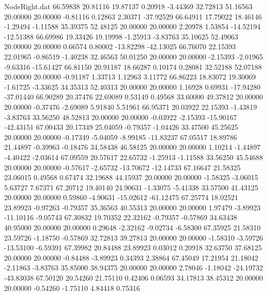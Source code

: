 \begin{filecontents}{NodeRight.dat}
  66.59838   20.81116   19.87137     0.20918   -3.44369   32.72813   51.16563   20.00000   20.00000   -0.81116    0.12863    2.30371  -37.92529
  66.64911   17.79022   18.46146    -1.29494   -1.11588   35.39375   52.48125   20.00000   20.00000    2.20978    1.53854  -14.52194  -12.51388
  66.69986   19.33426   19.19998    -1.25913   -3.83763   35.10625   52.49063   20.00000   20.00000    0.66574    0.80002  -13.82298  -42.13025
  66.76070   22.15393   22.01965    -0.86519   -1.40238   32.46563   50.01250   20.00000   20.00000   -2.15393   -2.01965   -9.63316  -15.61427
  66.81150   20.91187   18.66287     0.10174    0.28081   32.52188   52.07188   20.00000   20.00000   -0.91187    1.33713    1.12963    3.11772
  66.86223   18.83072   19.30069    -1.61725   -3.33625   34.35313   52.40313   20.00000   20.00000    1.16928    0.69931  -17.94280  -37.01440
  66.90289   20.37476   22.69089     0.53149    0.49568   33.60000   49.37812   20.00000   20.00000   -0.37476   -2.69089    5.91840    5.51961
  66.95371   20.03922   22.15393    -1.43819   -3.83763   33.56250   48.52813   20.00000   20.00000   -0.03922   -2.15393  -15.90167  -42.43151
  67.00433   20.17349   25.04059    -0.79357   -1.04426   33.47500   45.25625   20.00000   20.00000   -0.17349   -5.04059   -8.99185  -11.83237
  67.05517   18.89786   21.44897    -0.39963   -0.18476   34.58438   46.58125   20.00000   20.00000    1.10214   -1.44897   -4.40422   -2.03614
  67.09559   20.57617   22.65732    -1.25913   -1.11588   33.56250   45.54688   20.00000   20.00000   -0.57617   -2.65732  -13.70672  -12.14733
  67.16647   21.58325   23.06015     0.49568    0.67474   32.19688   44.15937   20.00000   20.00000   -1.58325   -3.06015    5.63727    7.67371
  67.20712   19.40140   24.90631    -1.33075   -5.41338   33.57500   41.43125   20.00000   20.00000    0.59860   -4.90631  -15.02612  -61.12475
  67.25774   18.02521   23.89923    -0.97263   -0.79357   35.36563   40.55313   20.00000   20.00000    1.97479   -3.89923  -11.10116   -9.05743
  67.30832   19.70352   22.32162    -0.79357   -0.57869   34.63438   40.95000   20.00000   20.00000    0.29648   -2.32162   -9.02734   -6.58300
  67.35925   21.58310   23.59726    -1.18750   -0.57869   32.72813   39.27813   20.00000   20.00000   -1.58310   -3.59726  -13.53100   -6.59391
  67.39982   20.84488   23.89923     0.03012    0.20918   32.63750   37.68125   20.00000   20.00000   -0.84488   -3.89923    0.34393    2.38864
  67.45049   17.21954   21.18042    -2.11863   -3.83763   35.85000   38.94375   20.00000   20.00000    2.78046   -1.18042  -24.19732  -43.83038
  67.50120   20.54260   21.75110     0.42406    0.06593   34.17813   38.45312   20.00000   20.00000   -0.54260   -1.75110    4.84418    0.75316

\end{filecontents}
